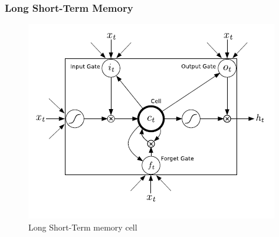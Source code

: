     \subsubsection*{Long Short-Term Memory}
    \begin{figure}[H]
        \centering
        \includegraphics[width=0.7\linewidth]{../images/Graves13-fig2-lstm_arch.png}
        \caption{Long Short-Term memory cell \cite{DBLP:journals/corr/Graves13}} \label{fig:lstm}
    \end{figure}
